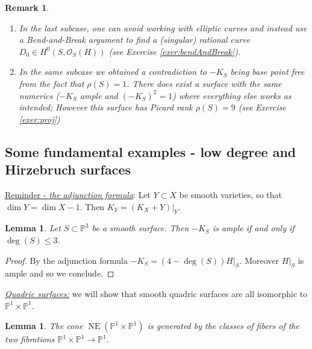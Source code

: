 \documentclass[a4paper,11pt]{amsart}
\newtheorem{lemma}[theorem]{Lemma}
\newtheorem{remark}[theorem]{Remark}
\def\dim{\operatorname{dim}}
\def\deg{\operatorname{deg}}
\def\NE{\operatorname{NE}}
\newcommand{\OO}{\mathcal{O}}
\newcommand{\PP}{\mathbb{P}}
\begin{document}
\begin{remark}\leavevmode	
	\begin{enumerate}
		\item In the last subcase, one can avoid working with elliptic curves and instead use a \emph{Bend-and-Break} argument to find a (singular) rational curve $D_0 \in H^0(S,\OO_S(H))$ (see Exercise \ref{exer:bendAndBreak}).
		\item In the same subcase we obtained a contradiction to $-K_S$ being base point free from the fact that $\rho(S) = 1$.
		There does exist a surface with the same numerics ($-K_S$ ample and $(-K_S)^2 = 1$) where everything else works as intended;
		However this surface has Picard rank $\rho(S) = 9$ (see Exercise \ref{exer:proj})
	\end{enumerate}
\end{remark}

\subsection{Some fundamental examples - low degree and Hirzebruch surfaces}\label{subsec:exaples}

\vspace{.3cm}

\begin{center}
	\begin{minipage}{.9\textwidth}\label{rem:adjunction}
		{\underline{Reminder - \emph{the adjunction formula}}}:
		Let $Y\subset X$ be smooth varieties, so that $\dim Y = \dim X - 1$.
		Then $K_Y = (K_X + Y)|_Y$.
	\end{minipage}
\end{center}

\vspace{.3cm}

\begin{lemma}
	Let $S\subset \PP^3$ be a smooth surface.
	Then $-K_S$ is ample if and only if $\deg(S) \leq 3$.
\end{lemma}

\begin{proof}
	By the adjunction formula $-K_S = (4-\deg(S))H|_S$.
	Moreover $H|_S$ is ample and so we conclude.
\end{proof}

\noindent\href{https://s-zikas.github.io/site/pics/italianSchool.jpg}{{\underline{\emph{Quadric surfaces:}}}} we will show that smooth quadric surfaces are all isomorphic to $\PP^1 \times \PP^1$.

\begin{lemma}\label{lem:coneP1P1}
	The cone $\NE(\PP^1 \times \PP^1)$  is generated by the classes of fibers of the two fibrations $\PP^1 \times \PP^1 \to \PP^1$.
\end{lemma}
\end{document}
